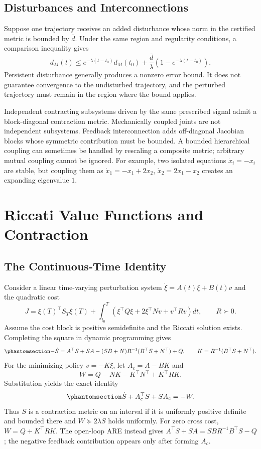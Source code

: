 \documentclass[
  10pt,
  letterpaper,
  DIV=11,
  numbers=noendperiod]{scrartcl}
\begin{document}
\subsection{Disturbances and
Interconnections}\label{disturbances-and-interconnections}

Suppose one trajectory receives an added disturbance whose norm in the
certified metric is bounded by \(\bar d\). Under the same region and
regularity conditions, a comparison inequality gives \[
d_M(t)\leq e^{-\lambda(t-t_0)}d_M(t_0)
+\frac{\bar d}{\lambda}\left(1-e^{-\lambda(t-t_0)}\right).
\] Persistent disturbance generally produces a nonzero error bound. It
does not guarantee convergence to the undisturbed trajectory, and the
perturbed trajectory must remain in the region where the bound applies.

Independent contracting subsystems driven by the same prescribed signal
admit a block-diagonal contraction metric. Mechanically coupled joints
are not independent subsystems. Feedback interconnection adds
off-diagonal Jacobian blocks whose symmetric contribution must be
bounded. A bounded hierarchical coupling can sometimes be handled by
rescaling a composite metric; arbitrary mutual coupling cannot be
ignored. For example, two isolated equations \(\dot x_i=-x_i\) are
stable, but coupling them as \(\dot x_1=-x_1+2x_2\),
\(\dot x_2=2x_1-x_2\) creates an expanding eigenvalue \(1\).

\section{Riccati Value Functions and
Contraction}\label{riccati-value-functions-and-contraction}

\subsection{The Continuous-Time
Identity}\label{the-continuous-time-identity}

Consider a linear time-varying perturbation system
\(\dot\xi=A(t)\xi+B(t)v\) and the quadratic cost \[
J=\xi(T)^\top S_T\xi(T)
+\int_{t_0}^T\left(\xi^\top Q\xi+2\xi^\top Nv+v^\top Rv\right)dt,
\qquad R\succ0.
\] Assume the cost block is positive semidefinite and the Riccati
solution exists. Completing the square in dynamic programming gives
\begin{equation}\phantomsection\label{eq-differential-riccati}{
-\dot S=A^\top S+SA-(SB+N)R^{-1}(B^\top S+N^\top)+Q,
\qquad
K=R^{-1}(B^\top S+N^\top).
}\end{equation} For the minimizing policy \(v=-K\xi\), let \(A_c=A-BK\)
and \[
W=Q-NK-K^\top N^\top+K^\top RK.
\] Substitution yields the exact identity
\begin{equation}\phantomsection\label{eq-closed-loop-lyapunov}{
\dot S+A_c^\top S+SA_c=-W.
}\end{equation} Thus \(S\) is a contraction metric on an interval if it
is uniformly positive definite and bounded there and
\(W\succeq2\lambda S\) holds uniformly. For zero cross cost,
\(W=Q+K^\top RK\). The open-loop ARE instead gives
\(A^\top S+SA=SBR^{-1}B^\top S-Q\); the negative feedback contribution
appears only after forming \(A_c\).
\end{document}
